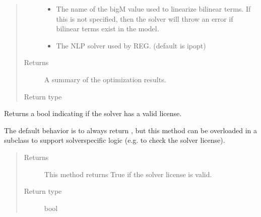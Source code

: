 \documentclass[letterpaper,10pt,english]{sphinxmanual}
\begin{document}
\begin{fulllineitems}
\begin{fulllineitems}
\begin{quote}
\begin{description}
\begin{itemize}
\item {} 
 \textendash{} The name of the big\sphinxhyphen{}M value used to linearize bilinear terms.  If this is not specified, then the solver will throw an error if bilinear terms exist in the model.

\item {} 
 \textendash{} The NLP solver used by REG.  (default is ipopt)

\end{itemize}

\item[{Returns}] \leavevmode
A summary of the optimization results.

\item[{Return type}] \leavevmode
{\hyperref[\detokenize{reference/solverapi:pao.common.solver.Results}]{}}

\end{description}\end{quote}

\end{fulllineitems}


\begin{fulllineitems}
\label{\detokenize{reference/pyomo:pao.pyomo.solvers.mpr_solvers.PyomoSubmodelSolver_REG.valid_license}}
Returns a bool indicating if the solver has a valid license.

The default behavior is to always return , but this method
can be overloaded in a subclass to support solver\sphinxhyphen{}specific logic
(e.g.  to check the solver license).
\begin{quote}\begin{description}
\item[{Returns}] \leavevmode
This method returns True if the solver license is valid.

\item[{Return type}] \leavevmode
bool

\end{description}\end{quote}

\end{fulllineitems}


\end{fulllineitems}
\end{document}
